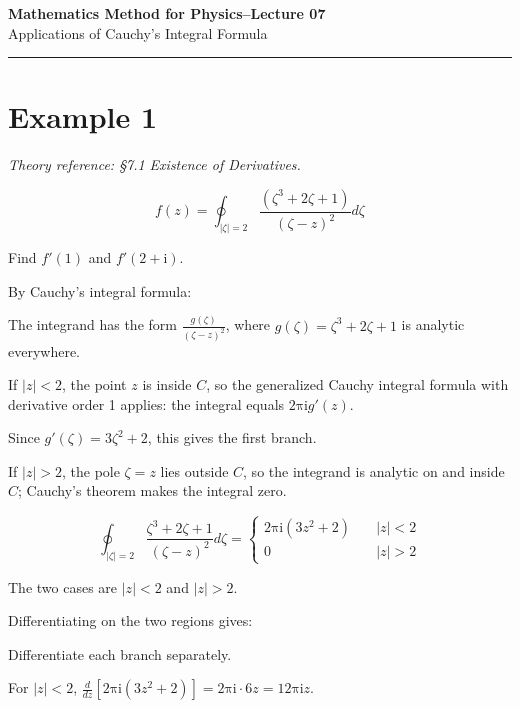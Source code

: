 \documentclass[11pt,a4paper]{article}
\theoremstyle{definition}
\theoremstyle{plain}
\begin{document}
\begin{center}
    {\LARGE \textbf{Mathematics Method for Physics--Lecture 07}} \\[0.6em]
    {\large Applications of Cauchy's Integral Formula}
\end{center}
\vspace{-0.5em}
\noindent\rule{\textwidth}{0.5pt}
\vspace{0.8em}
\section*{Example 1}

\textit{Theory reference: §7.1 Existence of Derivatives.}

\begin{equation}
f(z) = \oint_{\vert{}\zeta\vert{} = 2}\frac{(\zeta^{3} + 2\zeta + 1)}{(\zeta - z)^{2}}d\zeta
\end{equation}

Find $f'(1)$ and $f'(2 + \mathrm{i})$.

By Cauchy’s integral formula:

The integrand has the form $\frac{g(\zeta)}{(\zeta - z)^{2}}$, where $g(\zeta) = \zeta^{3} + 2\zeta + 1$ is analytic everywhere.

If $\vert{}z\vert{} < 2$, the point $z$ is inside $C$, so the generalized Cauchy integral formula with derivative order 1 applies: the integral equals $2\mathrm{\pi}\mathrm{i}g'(z)$.

Since $g'(\zeta) = 3\zeta^{2} + 2$, this gives the first branch.

If $\vert{}z\vert{} > 2$, the pole $\zeta = z$ lies outside $C$, so the integrand is analytic on and inside $C$; Cauchy’s theorem makes the integral zero.

\begin{equation}
\oint_{\vert{}\zeta\vert{} = 2}\frac{\zeta^{3} + 2\zeta + 1}{{(\zeta - z)}^{2}}d\zeta = \begin{cases} 2\mathrm{\pi}\mathrm{i}(3z^{2} + 2)\quad & \vert{}z\vert{} < 2 \\ 0 & \vert{}z\vert{} > 2 \end{cases}
\end{equation}

The two cases are $\vert{}z\vert{} < 2$ and $\vert{}z\vert{} > 2$.

Differentiating on the two regions gives:

Differentiate each branch separately.

For $\vert{}z\vert{} < 2$, $\frac{d}{dz}\left[2\mathrm{\pi}\mathrm{i}(3z^{2} + 2)\right] = 2\mathrm{\pi}\mathrm{i} \cdot 6z = 12\mathrm{\pi}\mathrm{i}z$.
\end{document}
